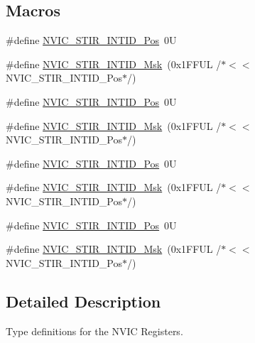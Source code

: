 \subsection*{Macros}
\begin{DoxyCompactItemize}
\item 
\#define \hyperlink{group___c_m_s_i_s___n_v_i_c_ga9eebe495e2e48d302211108837a2b3e8}{N\+V\+I\+C\+\_\+\+S\+T\+I\+R\+\_\+\+I\+N\+T\+I\+D\+\_\+\+Pos}~0U
\item 
\#define \hyperlink{group___c_m_s_i_s___n_v_i_c_gae4060c4dfcebb08871ca4244176ce752}{N\+V\+I\+C\+\_\+\+S\+T\+I\+R\+\_\+\+I\+N\+T\+I\+D\+\_\+\+Msk}~(0x1\+F\+F\+U\+L /$\ast$$<$$<$ N\+V\+I\+C\+\_\+\+S\+T\+I\+R\+\_\+\+I\+N\+T\+I\+D\+\_\+\+Pos$\ast$/)
\item 
\#define \hyperlink{group___c_m_s_i_s___n_v_i_c_ga9eebe495e2e48d302211108837a2b3e8}{N\+V\+I\+C\+\_\+\+S\+T\+I\+R\+\_\+\+I\+N\+T\+I\+D\+\_\+\+Pos}~0U
\item 
\#define \hyperlink{group___c_m_s_i_s___n_v_i_c_gae4060c4dfcebb08871ca4244176ce752}{N\+V\+I\+C\+\_\+\+S\+T\+I\+R\+\_\+\+I\+N\+T\+I\+D\+\_\+\+Msk}~(0x1\+F\+F\+U\+L /$\ast$$<$$<$ N\+V\+I\+C\+\_\+\+S\+T\+I\+R\+\_\+\+I\+N\+T\+I\+D\+\_\+\+Pos$\ast$/)
\item 
\#define \hyperlink{group___c_m_s_i_s___n_v_i_c_ga9eebe495e2e48d302211108837a2b3e8}{N\+V\+I\+C\+\_\+\+S\+T\+I\+R\+\_\+\+I\+N\+T\+I\+D\+\_\+\+Pos}~0U
\item 
\#define \hyperlink{group___c_m_s_i_s___n_v_i_c_gae4060c4dfcebb08871ca4244176ce752}{N\+V\+I\+C\+\_\+\+S\+T\+I\+R\+\_\+\+I\+N\+T\+I\+D\+\_\+\+Msk}~(0x1\+F\+F\+U\+L /$\ast$$<$$<$ N\+V\+I\+C\+\_\+\+S\+T\+I\+R\+\_\+\+I\+N\+T\+I\+D\+\_\+\+Pos$\ast$/)
\item 
\#define \hyperlink{group___c_m_s_i_s___n_v_i_c_ga9eebe495e2e48d302211108837a2b3e8}{N\+V\+I\+C\+\_\+\+S\+T\+I\+R\+\_\+\+I\+N\+T\+I\+D\+\_\+\+Pos}~0U
\item 
\#define \hyperlink{group___c_m_s_i_s___n_v_i_c_gae4060c4dfcebb08871ca4244176ce752}{N\+V\+I\+C\+\_\+\+S\+T\+I\+R\+\_\+\+I\+N\+T\+I\+D\+\_\+\+Msk}~(0x1\+F\+F\+U\+L /$\ast$$<$$<$ N\+V\+I\+C\+\_\+\+S\+T\+I\+R\+\_\+\+I\+N\+T\+I\+D\+\_\+\+Pos$\ast$/)
\end{DoxyCompactItemize}


\subsection{Detailed Description}
Type definitions for the N\+V\+IC Registers. 



